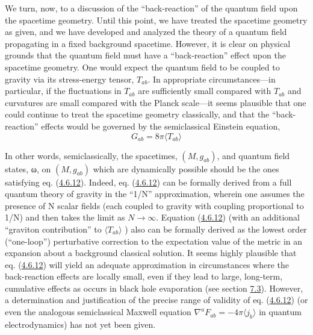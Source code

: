 \documentclass[11pt,a4paper]{article}
\begin{document}
We turn, now, to a discussion of the ``back-reaction'' of the quantum field upon the spacetime geometry. Until this point, we have treated the spacetime geometry as given, and we have developed and analyzed the theory of a quantum field propagating in a fixed background spacetime. However, it is clear on physical grounds that the quantum field must have a ``back-reaction'' effect upon the spacetime geometry. One would expect the quantum field to be coupled to gravity via its stress-energy tensor, \(T_{ab}\). In appropriate circumstances---in particular, if the fluctuations in \(T_{ab}\) are sufficiently small compared with \(T_{ab}\) and curvatures are small compared with the Planck scale---it seems plausible that one could continue to treat the spacetime geometry classically, and that the ``back-reaction'' effects would be governed by the semiclassical Einstein equation,
\begin{equation*}
G_{ab} = 8\pi \langle T_{ab}\rangle \tag{4.6.12}\label{eq:4.6.12}
\end{equation*}

In other words, semiclassically, the spacetimes, \((M,g_{ab})\), and quantum field states, ω, on \((M,g_{ab})\) which are dynamically possible should be the ones satisfying eq. (\hyperref[eq:4.6.12]{4.6.12}). Indeed, eq. (\hyperref[eq:4.6.12]{4.6.12}) can be formally derived from a full quantum theory of gravity in the ``1/N'' approximation, wherein one assumes the presence of N scalar fields (each coupled to gravity with coupling proportional to 1/N) and then takes the limit as \(N\rightarrow\infty\). Equation (\hyperref[eq:4.6.12]{4.6.12}) (with an additional ``graviton contribution'' to \(\langle T_{ab}\rangle \) ) also can be formally derived as the lowest order (``one-loop'') perturbative correction to the expectation value of the metric in an expansion about a background classical solution. It seems highly plausible that eq. (\hyperref[eq:4.6.12]{4.6.12}) will yield an adequate approximation in circumstances where the back-reaction effects are locally small, even if they lead to large, long-term, cumulative effects as occurs in black hole evaporation (see section \hyperlink{sec:7.3}{7.3}). However, a determination and justification of the precise range of validity of eq. (\hyperref[eq:4.6.12]{4.6.12}) (or even the analogous semiclassical Maxwell equation \(\nabla^a F_{ab}=-4\pi\langle j_b\rangle\) in quantum electrodynamics) has not yet been given.
\end{document}
